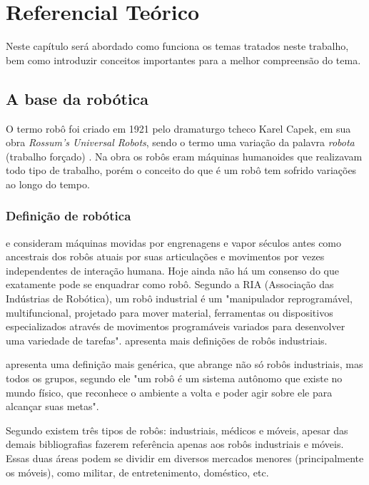 \chapter[Referencial Teórico]{Referencial Teórico}

Neste capítulo será abordado como funciona os temas tratados neste trabalho, bem como introduzir conceitos importantes para a melhor compreensão do tema.

\section{A base da robótica}

O termo robô foi criado em 1921 pelo dramaturgo tcheco Karel Capek, em sua obra \textit{Rossum’s Universal Robots}, sendo o  termo uma variação da palavra \textit{robota} (trabalho forçado) \cite{Mataric2007}. Na obra os robôs eram máquinas humanoides que realizavam todo tipo de trabalho, porém o conceito do que é um robô tem sofrido variações ao longo do tempo. 

\subsection{Definição de robótica}

\cite{Mataric2007} e \cite{Abreu2001} consideram máquinas movidas por engrenagens e vapor séculos antes como ancestrais dos robôs atuais por suas articulações e movimentos por vezes independentes de interação humana. Hoje ainda não há um consenso do que exatamente pode se enquadrar como robô. Segundo a RIA (Associação das Indústrias de Robótica), um robô industrial é um "manipulador reprogramável, multifuncional, projetado para mover material, ferramentas ou dispositivos especializados através de movimentos programáveis variados para desenvolver uma variedade de tarefas". \cite{Abreu2001} apresenta mais definições de robôs industriais. 

\cite{Mataric2007} apresenta uma definição mais genérica, que abrange não só robôs industriais, mas todos os grupos, segundo ele "um robô é um sistema autônomo que existe no mundo físico, que reconhece o ambiente a volta e poder agir sobre ele para alcançar suas metas".

Segundo \cite{Secchi2008} existem três tipos de robôs: industriais, médicos e móveis, apesar das demais bibliografias fazerem referência apenas aos robôs industriais e móveis. Essas duas áreas podem se dividir em diversos mercados menores (principalmente os móveis), como militar, de entretenimento, doméstico, etc.

